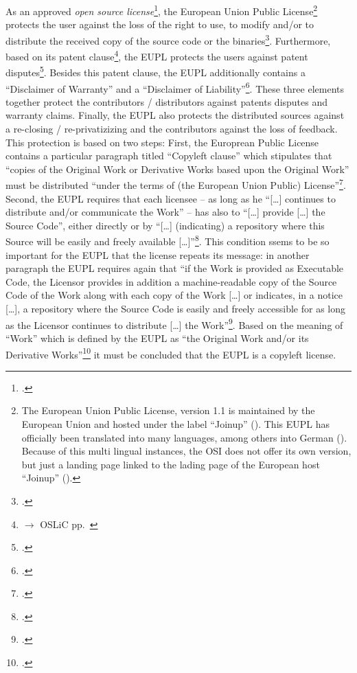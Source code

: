 As an approved \emph{open source license}\footcite[cf.][\nopage wp]{OSI2012b},
the European Union Public License\footnote{ The European Union Public License,
version 1.1 is maintained by the European Union and hosted under the label
\enquote{Joinup} (\cite[cf.][\nopage wp]{EuplLicense2007en}).
This EUPL has officially been translated into many languages, among others into
German (\cite[cf.][\nopage wp]{EuplLicense2007de}). Because of this multi
lingual instances, the OSI does not offer its own version, but just a landing
page linked to the lading page of the European host \enquote{Joinup}
(\cite[cf.][\nopage wp]{Eupl11OsiLicense2007a}).} protects the user against the
loss of the right to use, to modify and/or to distribute the received copy of
the source code or the binaries\footcite[cf.][\nopage wp\
§2]{EuplLicense2007de}. Furthermore, based on its patent
clause\footnote{$\rightarrow$ OSLiC pp.\ \pageref{subsec:EupLPatentClause}}, the
EUPL protects the users against patent disputes\footcite[cf.][\nopage wp\ §2,
at its tail]{EuplLicense2007en}. Besides this patent clause, the EUPL
additionally contains a \enquote{Disclaimer of Warranty} and a
\enquote{Disclaimer of Liability}\footcite[cf.][\nopage wp\ §7 \&
§8]{EuplLicense2007en}. These three elements together protect the contributors /
distributors against patents disputes and warranty claims. Finally, the EUPL
also protects the distributed sources against a re-closing / re-privatizizing
and the contributors against the loss of feedback. This protection is based on
two steps: First, the Europrean Public License contains a particular paragraph
titled \enquote{Copyleft clause} which stipulates that \enquote{copies of the
Original Work or Derivative Works based upon the Original Work} must be
distributed \enquote{under the terms of (the European Union Public)
License}\footcite[cf.][\nopage wp\ §5]{EuplLicense2007en}. Second, the EUPL
requires that each licensee -- as long as he \enquote{[\ldots] continues to
distribute and/or communicate the Work} -- has also to \enquote{[\ldots] provide
[\ldots] the Source Code}, either directly or by \enquote{[\ldots] (indicating)
a repository where this Source will be easily and freely available
[\ldots]}\footcite[cf.][\nopage wp\ §5]{EuplLicense2007en}. This condition
ssems to be so important for the EUPL that the license repeats its message: in
another paragraph the EUPL requires again that \enquote{if the Work is provided
as Executable Code, the Licensor provides in addition a machine-readable copy of
the Source Code of the Work along with each copy of the Work [\ldots] or
indicates, in a notice [\ldots], a repository where the Source Code is easily
and freely accessible for as long as the Licensor continues to distribute
[\ldots] the Work}\footcite[cf.][\nopage wp\ §3]{EuplLicense2007en}. Based on
the meaning of \enquote{Work} which is defined by the EUPL as \enquote{the
Original Work and/or its Derivative Works}\footcite[cf.][\nopage wp\
§1]{EuplLicense2007en} it must be concluded that the EUPL is a copyleft license.


